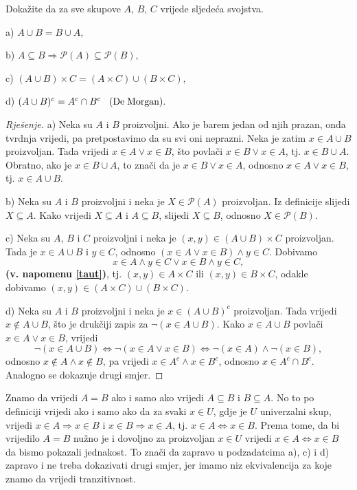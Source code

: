 \begin{exercise}
Dokažite da za sve skupove $A$, $B$, $C$ vrijede sljedeća svojstva.
\begin{AutoMultiColItemize}
\item[a)] $A\cup B=B\cup A,$
\item[b)] $A\subseteq B\Rightarrow \mathcal{P}(A)\subseteq \mathcal{P}(B),$
\item[c)] $(A\cup B)\times C=(A\times C)\cup (B\times C),$
\item[d)] $(A\cup B)^c=A^c\cap B^c \hspace{0.3cm} \mathrm{(De} \hspace{0.1cm}\mathrm{Morgan)}.$
\end{AutoMultiColItemize}
\begin{proof}[Rješenje]
a) Neka su $A$ i $B$ proizvoljni. Ako je barem jedan od njih prazan, onda tvrdnja vrijedi, pa pretpostavimo da su svi oni neprazni. Neka je zatim $x\in A\cup B$ proizvoljan. Tada vrijedi $x\in A\vee x\in B$, što povlači $x\in B\vee x\in A$, tj. $x\in B\cup A$. Obratno, ako je $x\in B\cup A$, to znači da je $x\in B\vee x\in A$, odnosno $x\in A\vee x\in B$, tj. $x\in A\cup B$.

b) Neka su $A$ i $B$ proizvoljni i neka je $X\in \mathcal{P}(A)$ proizvoljan. Iz definicije slijedi $X\subseteq A$. Kako vrijedi $X\subseteq A$ i $A\subseteq B$, slijedi $X\subseteq B$, odnosno $X\in \mathcal{P}(B)$.

c) Neka su $A$, $B$ i $C$ proizvoljni i neka je $(x, y)\in (A\cup B)\times C$ proizvoljan. Tada je $x\in A\cup B$ i $y\in C$, odnosno $(x\in A\vee x\in B)\wedge y\in C$. Dobivamo $$x\in A\wedge y\in C\vee x\in B\wedge y\in C,$$
\textbf{(v. napomenu \ref{taut})}, tj. $(x, y)\in A\times C$ ili $(x, y)\in B\times C$, odakle dobivamo $(x, y)\in (A\times C)\cup (B\times C)$.

d) Neka su $A$ i $B$ proizvoljni i neka je $x\in (A\cup B)^c$ proizvoljan. Tada vrijedi $x\notin A\cup B$, što je drukčiji zapis za $\neg(x\in A\cup B)$. Kako $x\in A\cup B$ povlači $x\in A \vee x\in B$, vrijedi $$\neg(x\in A\cup B)\Leftrightarrow\neg(x\in A \vee x\in B)\Leftrightarrow\neg (x\in A)\wedge \neg (x\in B),$$ odnosno $x\notin A \wedge x\notin B$, pa vrijedi $x\in A^c\wedge x\in B^c$, odnosno $x\in A^c\cap B^c$. Analogno se dokazuje drugi smjer.
\end{proof}
\end{exercise}
\begin{remark}
\label{firstrem}
Znamo da vrijedi $A=B$ ako i samo ako vrijedi $A\subseteq B$ i $B\subseteq A$. No to po definiciji vrijedi ako i samo ako da za svaki $x\in U$, gdje je $U$ univerzalni skup, vrijedi $x\in A\Rightarrow x\in B$ i $x\in B\Rightarrow x\in A$, tj. $x\in A\Leftrightarrow x\in B$. Prema tome, da bi vrijedilo $A=B$ nužno je i dovoljno za proizvoljan $x\in U$ vrijedi $x\in A\Leftrightarrow x\in B$ da bismo pokazali jednakost. To znači da zapravo u podzadatcima a), c) i d) zapravo i ne treba dokazivati drugi smjer, jer imamo niz ekvivalencija za koje znamo da vrijedi tranzitivnost.
\end{remark}


